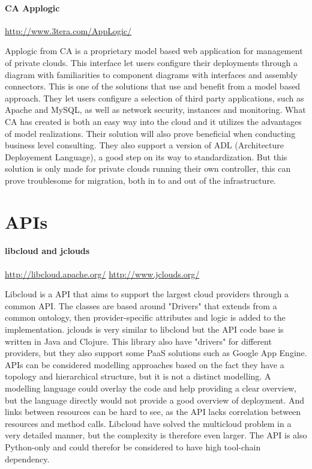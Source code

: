\paragraph{CA Applogic}
\url{http://www.3tera.com/AppLogic/}

Applogic from CA is a proprietary model based web application for management of private clouds. 
This interface let users configure their deployments through a diagram with familiarities to component diagrams with interfaces and assembly connectors. 
This is one of the solutions that use and benefit from a model based approach. They let users configure a selection of third party applications, 
such as Apache and MySQL, as well as network security, instances and monitoring. 
What CA has created is both an easy way into the cloud and it utilizes the advantages of model realizations. 
Their solution will also prove beneficial when conducting business level consulting. 
They also support a version of ADL (Architecture Deployement Language), a good step on its way to standardization. 
But this solution is only made for private clouds running their own controller, this can prove troublesome for migration, both in to and out of the infrastructure.

\section{APIs}

\paragraph{libcloud and jclouds}
\url{http://libcloud.apache.org/}
\url{http://www.jclouds.org/}

Libcloud is a API that aims to support the largest cloud providers through a common API. 
The classes are based around "Drivers" that extends from a common ontology, then provider-specific attributes and logic is added to the implementation.
jclouds is very similar to libcloud but the API code base is written in Java and Clojure. 
This library also have "drivers" for different providers, but they also support some PaaS solutions such as Google App Engine.
APIs can be considered modelling approaches based on the fact they have a topology and hierarchical structure, 
but it is not a distinct modelling. A modelling language could overlay the code and help providing a clear overview, 
but the language directly would not provide a good overview of deployment. 
And links between resources can be hard to see, as the API lacks correlation between resources and method calls. 
Libcloud have solved the multicloud problem in a very detailed manner, but the complexity is therefore even larger. 
The API is also Python-only and could therefor be considered to have high tool-chain dependency.

